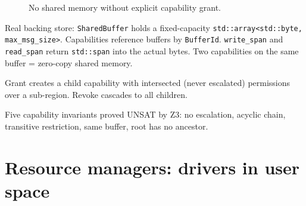 \documentclass[11pt]{article}
\begin{document}
\begin{figure}[ht]
\centering
{}
\caption{No shared memory without explicit capability grant.}
\end{figure}

Real backing store: \texttt{SharedBuffer} holds a fixed-capacity
\texttt{std::array<std::byte, max\_msg\_size>}.  Capabilities reference buffers
by \texttt{BufferId}.  \texttt{write\_span} and \texttt{read\_span}
return \texttt{std::span} into the actual bytes.  Two capabilities
on the same buffer = zero-copy shared memory.

Grant creates a child capability with intersected (never escalated)
permissions over a sub-region.  Revoke cascades to all children.

Five capability invariants proved UNSAT by Z3:
no escalation, acyclic chain, transitive restriction,
same buffer, root has no ancestor.

\section{Resource managers: drivers in user space}
\end{document}
